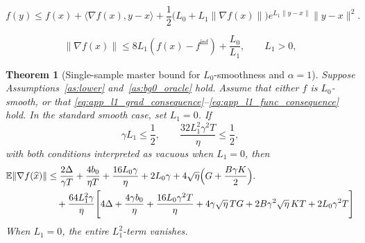 \documentclass[10pt,a4paper]{amsart}
\newtheorem{theorem}{Theorem}
\newcommand{\E}{\mathbb{E}}
\begin{document}
\begin{equation}
\label{eq:app_l1_func_consequence}
    f(y)
    \le
    f(x)+\langle\nabla f(x),y-x\rangle
    +\frac12
    \bigl(L_0+L_1\|\nabla f(x)\|\bigr)
    e^{L_1\|y-x\|}
    \|y-x\|^2.
\end{equation}

\begin{equation}
\label{eq:app_grad_growth_l1}
    \|\nabla f(x)\|
    \le
    8L_1(f(x)-f^{\inf})+\frac{L_0}{L_1},
    \qquad L_1>0,
\end{equation}

\begin{theorem}[Single-sample master bound for \(L_0\)-smoothness and \(\alpha=1\)]
\label{thm:app_nsgdm_l1_master}
Suppose Assumptions~\ref{as:lower} and~\ref{as:bg0_oracle} hold. Assume
that either \(f\) is \(L_0\)-smooth, or that
\eqref{eq:app_l1_grad_consequence}--\eqref{eq:app_l1_func_consequence} hold.
In the standard smooth case, set \(L_1=0\). If
\begin{equation}
\label{eq:app_l1_master_conditions}
    \gamma L_1\le \frac12,
    \qquad
    \frac{32L_1^2\gamma^2T}{\eta}\le\frac12,
\end{equation}
with both conditions interpreted as vacuous when \(L_1=0\), then
\begin{align}
\E\|\nabla f(\widehat x)\|
&\le
\frac{2\Delta}{\gamma T}
+\frac{4b_0}{\eta T}
+\frac{16L_0\gamma}{\eta}
+2L_0\gamma +4\sqrt{\eta}
\Big(G+\frac{B\gamma K}{2}\Big).
\notag\\
&
\quad
+\frac{64L_1^2\gamma}{\eta}
\Bigg[
4\Delta
+\frac{4\gamma b_0}{\eta}
+\frac{16L_0\gamma^2T}{\eta}
+4\gamma\sqrt{\eta}\,TG
+2B\gamma^2\sqrt{\eta}\,KT
+2L_0\gamma^2T
\Bigg]
\label{eq:app_l1_master_bound}
\end{align}
When \(L_1=0\), the entire \(L_1^2\)-term vanishes.
\end{theorem}
\end{document}
